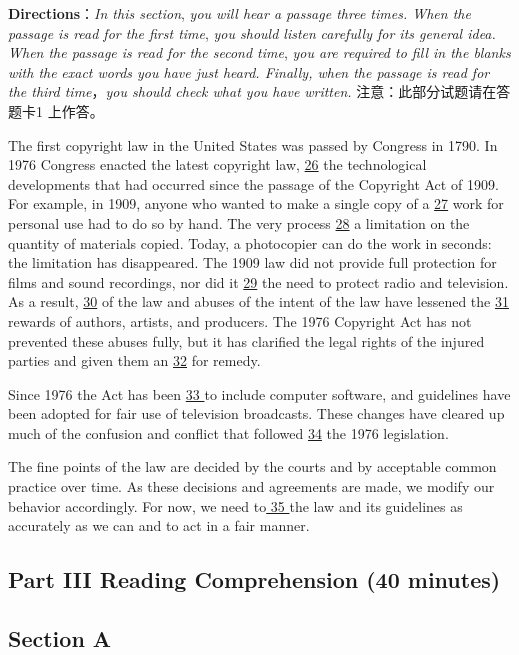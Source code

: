 \documentclass[UTF8,11pt]{ctexart}
\begin{document}
\textbf{Directions}：\textit{In this section},\textit{ you will hear a passage three times. When the passage is read for the first time},\textit{ you should listen} \textit{carefully for its general idea. When the passage is read for the second time},\textit{ you are required to fill in the blanks with the} \textit{exact words you have just heard. Finally, when the passage is read for the third time}，\textit{you should check what you have} \textit{written.} 注意：此部分试题请在答题卡1 上作答。


The first copyright law in the United States was passed by Congress in 1790. In 1976 Congress enacted the latest copyright law, \uline{26} the technological developments that had occurred since the passage of the Copyright Act of 1909. For example, in 1909, anyone who wanted to make a single copy of a \uline{27} work for personal use had to do so by hand. The very process \uline{28} a limitation on the quantity of materials copied. Today, a photocopier can do the work in seconds: the limitation has disappeared. The 1909 law did not provide full protection for films and sound recordings, nor did it \uline{29} the need to protect radio and television. As a result, \uline{30} of the law and abuses of the intent of the law have lessened the \uline{31 }rewards of authors, artists, and producers. The 1976 Copyright Act has not prevented these abuses fully, but it has clarified the legal rights of the injured parties and given them an \uline{32} for remedy.


Since 1976 the Act has been \uline{33 }to include computer software, and guidelines have been adopted for fair use of television broadcasts. These changes have cleared up much of the confusion and conflict that followed \uline{34} the 1976 legislation.


The fine points of the law are decided by the courts and by acceptable common practice over time. As these decisions and agreements are made, we modify our behavior accordingly. For now, we need to\uline{ 35 }the law and its guidelines as accurately as we can and to act in a fair manner.


\subsection*{\textbf{Part} III \textbf{Reading Comprehension} \textbf{(40 minutes)}}


\subsection*{\textbf{Section A}}
\end{document}
